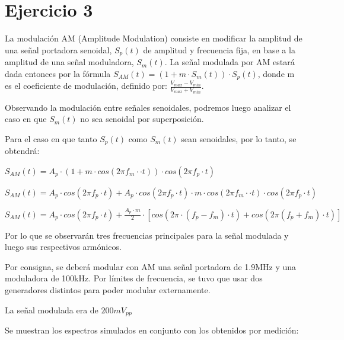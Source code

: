 \documentclass[../../labo_tp5_main.tex]{subfiles}
\begin{document}
\section{Ejercicio 3}

La modulación AM (Amplitude Modulation) consiste en modificar la amplitud de una señal portadora senoidal, $S_p(t)$ de amplitud y frecuencia fija, en base a la amplitud de una señal moduladora, $S_m(t)$. 
La señal modulada por AM estará dada entonces por la fórmula $S_{AM}(t) = (1 + m\cdot S_m(t))\cdot S_p(t)$, donde m es el coeficiente de modulación, definido por: $\frac{V_{max} - V_{min}}{V_{max} + V_{min}}$.\par
Observando la modulación entre señales senoidales, podremos luego analizar el caso en que $S_m(t)$ no sea senoidal por superposición. \par

Para el caso en que tanto $S_p(t)$ como $S_m(t)$ sean senoidales, por lo tanto, se obtendrá:\par
\begin{center}
$S_{AM}(t) = A_p\cdot (1 + m\cdot cos(2\pi f_m\cdot\cdot t))\cdot cos(2\pi f_p\cdot t)$\par
$S_{AM}(t) = A_p\cdot cos(2\pi f_p\cdot t) + A_p\cdot cos(2\pi f_p\cdot t)\cdot m\cdot cos(2\pi f_m\cdot\cdot t)\cdot cos(2\pi f_p\cdot t)$\par
$S_{AM}(t) = A_p\cdot cos(2\pi f_p\cdot t) + \frac{A_p\cdot m}{2}\cdot [cos(2\pi \cdot (f_p-f_m)\cdot t) + cos(2\pi (f_p+f_m)\cdot t)]$\par
\end{center}

Por lo que se observarán tres frecuencias principales para la señal modulada y luego sus respectivos armónicos.\par
Por consigna, se deberá modular con AM una señal portadora de 1.9MHz y una moduladora de 100kHz. Por límites de frecuencia, se tuvo que usar dos generadores distintos para poder modular externamente.\par
La señal modulada era de $200mV_{pp}$ 

Se muestran los espectros simulados en conjunto con los obtenidos por medición:
\end{document}
